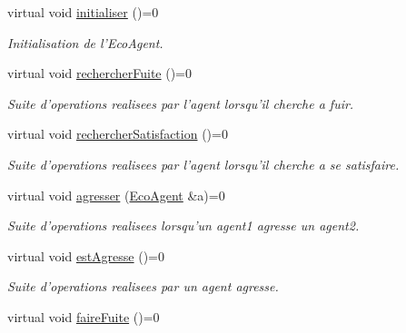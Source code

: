 \begin{CompactItemize}
virtual void \hyperlink{classEcoAgent_f779fd214bed010d0f6b7b137fde7116}{initialiser} ()=0
\begin{CompactList}\small\item\em Initialisation de l'EcoAgent. \item\end{CompactList}\item 
\hypertarget{classEcoAgent_4b20031a336e8497412e3f5df4155e28}{
virtual void \hyperlink{classEcoAgent_4b20031a336e8497412e3f5df4155e28}{rechercherFuite} ()=0}
\label{classEcoAgent_4b20031a336e8497412e3f5df4155e28}

\begin{CompactList}\small\item\em Suite d'operations realisees par l'agent lorsqu'il cherche a fuir. \item\end{CompactList}\item 
\hypertarget{classEcoAgent_77119c5004b4c7555ad5eca0197eb805}{
virtual void \hyperlink{classEcoAgent_77119c5004b4c7555ad5eca0197eb805}{rechercherSatisfaction} ()=0}
\label{classEcoAgent_77119c5004b4c7555ad5eca0197eb805}

\begin{CompactList}\small\item\em Suite d'operations realisees par l'agent lorsqu'il cherche a se satisfaire. \item\end{CompactList}\item 
virtual void \hyperlink{classEcoAgent_867f0c274eb3ed0b61cb1fe7baa67edd}{agresser} (\hyperlink{classEcoAgent}{EcoAgent} \&a)=0
\begin{CompactList}\small\item\em Suite d'operations realisees lorsqu'un agent1 agresse un agent2. \item\end{CompactList}\item 
\hypertarget{classEcoAgent_a27bced909d9d84e8f23ec2d65bbed56}{
virtual void \hyperlink{classEcoAgent_a27bced909d9d84e8f23ec2d65bbed56}{estAgresse} ()=0}
\label{classEcoAgent_a27bced909d9d84e8f23ec2d65bbed56}

\begin{CompactList}\small\item\em Suite d'operations realisees par un agent agresse. \item\end{CompactList}\item 
\hypertarget{classEcoAgent_80b798ec4abc1585c42185ae88445695}{
virtual void \hyperlink{classEcoAgent_80b798ec4abc1585c42185ae88445695}{faireFuite} ()=0}
\label{classEcoAgent_80b798ec4abc1585c42185ae88445695}


\end{CompactItemize}
